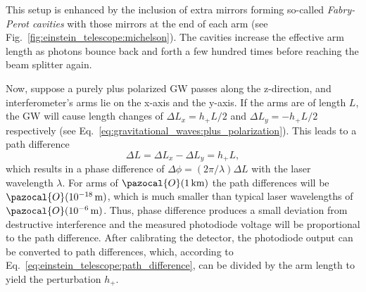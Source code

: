 This setup is enhanced by the inclusion of extra mirrors forming so-called \emph{Fabry-Perot cavities} with those mirrors at the end of each arm (see Fig.~\ref{fig:einstein_telescope:michelson}). The cavities increase the effective arm length as photons bounce back and forth a few hundred times before reaching the beam splitter again.

Now, suppose a purely plus polarized GW passes along the z-direction, 
and interferometer's arms lie on the x-axis and the y-axis. If the arms are of length $L$, the GW will cause length changes of  
$\Delta L_x = h_+L/2$ and $\Delta L_y = -h_+L/2$
respectively (see Eq.~\ref{eq:gravitational_waves:plus_polarization}). This leads to a path difference 
\begin{equation}
	\label{eq:einstein_telescope:path_difference}
	\Delta L = \Delta L_x - \Delta L_y = h_+L,	
\end{equation} 
which results in a phase difference of $\Delta \phi = (2\pi/\lambda) \Delta L$ with the laser wavelength $\lambda$. For arms of $\pazocal{O}(\SI{1}{\kilo\meter})$ the path differences will be $\pazocal{O}(\SI{E-18}{\meter})$, which is much smaller than typical laser wavelengths of $\pazocal{O}(\SI{E-6}{\meter})$. Thus, phase difference produces a small deviation from destructive interference and the measured photodiode voltage will be proportional to the path difference. 
After calibrating the detector, the photodiode output can be converted to path differences, which, according to Eq.~\ref{eq:einstein_telescope:path_difference}, can be divided by the arm length to yield the perturbation $h_+$. 

